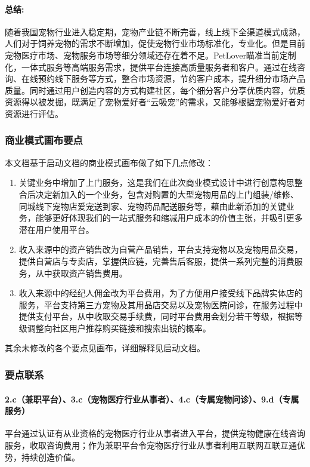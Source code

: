\documentclass[a4paper]{ctexart}
\begin{document}
\paragraph{总结:}

随着我国宠物行业进入稳定期，宠物产业链不断完善，线上线下全渠道模式成熟，人们对于饲养宠物的需求不断增加，促使宠物行业市场标准化，专业化。但是目前宠物医疗市场、宠物服务市场等细分领域还存在着不足。PetLover瞄准当前定制化，一体式服务等高端服务需求，提供平台连接高质量服务者和客户。通过在线咨询、在线预约线下服务等方式，整合市场资源，节约客户成本，提升细分市场产品质量。同时通过用户创造内容的方式构建社区，每个细分客户分享优质内容，优质资源得以被发掘，既满足了宠物爱好者“云吸宠”的需求，又能够根据宠物爱好者对资源进行评估。

\subsubsection{商业模式画布要点}

本文档基于启动文档的商业模式画布做了如下几点修改：
\begin{enumerate}[label=\alph*.]
  \item 关键业务中增加了上门服务，这是我们在此次商业模式设计中进行创意构思整合后决定新加入的一个业务，包含对购置的大型宠物用品的上门组装/维修、同城线下宠物店爱宠送到家、宠物药品配送服务等，藉由此新添加的关键业务，能够更好体现我们的一站式服务和缩减用户成本的价值主张，并吸引更多潜在用户使用平台。
  \item 收入来源中的资产销售改为自营产品销售，平台支持宠物以及宠物用品交易，提供自营店与专卖店，掌握供应链，完善售后客服，提供一系列完整的消费服务，从中获取资产销售费用。
  \item 收入来源中的经纪人佣金改为平台费用，为了方便用户接受线下品牌实体店的服务，平台支持第三方宠物及其用品店交易以及宠物医院问诊，在服务过程中提供支付平台，从中收取交易手续费，同时平台费用会划分若干等级，根据等级调整向社区用户推荐购买链接和搜索出镜的概率。
\end{enumerate}

其余未修改的各个要点见画布，详细解释见启动文档。

\subsubsection{要点联系}

\paragraph{2.c（兼职平台）、3.c（宠物医疗行业从事者）、4.c（专属宠物问诊）、9.d（专属服务）}平台通过认证有从业资格的宠物医疗行业从事者进入平台，提供宠物健康在线咨询服务，收取咨询费用；作为兼职平台令宠物医疗行业从事者利用互联网互联互通优势，持续创造价值。
\end{document}
